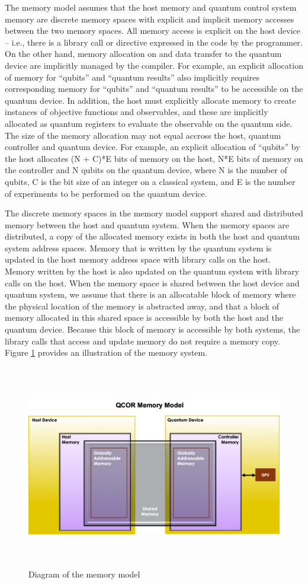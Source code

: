 The \qcor memory model assumes that the host memory and quantum control system memory are discrete memory spaces with explicit and implicit memory accesses between the two memory spaces.  
All memory access is explicit on the host device -- i.e., there is a library call or directive expressed in the code by the programmer. On the other hand, memory allocation on and data transfer to the quantum device are implicitly managed by the compiler. For example, an explicit allocation of memory for ``qubits'' and ``quantum results'' also implicitly requires corresponding memory for ``qubits'' and ``quantum results'' to be accessible on the quantum device. In addition, the host must explicitly allocate memory to create instances of objective functions and observables, and these are implicitly allocated as quantum registers to evaluate the observable on the quantum side. The size of the memory allocation may not equal accross the host, quantum controller and quantum device.  For example, an explicit allocation of ``qubits'' by the host allocates (N + C)*E bits of memory on the host, N*E bits of memory on the controller and N qubits on the quantum device, where N is the number of qubits, C is the bit size of an integer on a classical system, and E is the number of experiments to be performed on the quantum device.

The discrete memory spaces in the \qcor memory model support shared and distributed memory between the host and quantum system. 
When the memory spaces are distributed, a copy of the allocated memory exists in both the host and quantum system address spaces.  
Memory that is written by the quantum system is updated in the host memory address space with library calls on the host. 
Memory written by the host is also updated on the quantum system with library calls on the host.  
When the memory space is shared between the host device and quantum system, we assume that there is an allocatable block of memory where the physical location of the memory is abstracted away, and that a block of memory allocated in this shared space is accessible by both the host and the quantum device. Because this block of memory is accessible by both systems, the library calls that access and update memory do not require a memory copy. Figure \ref{fig:mem_model} provides an illustration of the memory system.

\begin{figure}[ht]
 \centering
  \includegraphics[height=3.5in,width=5.5in]{figures/Memory_Model_Illustration_v4.png}
  \caption{Diagram of the \qcor memory model}
  \label{fig:mem_model}
\end{figure}
